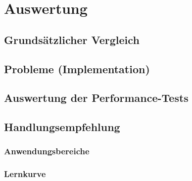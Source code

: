 \chapter{Auswertung}

\section{Grundsätzlicher Vergleich}
\section{Probleme (Implementation)}
\section{Auswertung der Performance-Tests}
\section{Handlungsempfehlung}
\subsection{Anwendungsbereiche}
\subsection{Lernkurve}